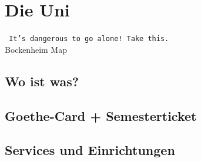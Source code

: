 \documentclass[12pt,a4paper]{scrartcl}
\begin{document}
\section{Die Uni}
			\begin{center}
			\texttt{ It's dangerous to go alone! Take this. }
            \\Bockenheim Map
			\end{center}
		\pagebreak
	\subsection{Wo ist was?}
    
		
	\newpage
    \subsection{Goethe-Card + Semesterticket}
    
    
    \subsection{Services und Einrichtungen}
\end{document}
